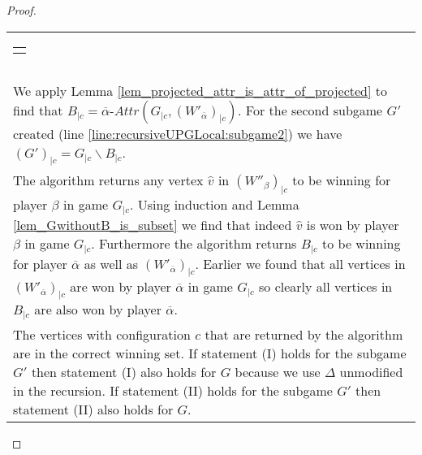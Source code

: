 \begin{theorem}
\begin{proof}
\begin{longtable}{|p{14.2cm}}
\begin{tabular}{|p{14cm}}
\begin{tabular}{|p{13.8cm}}
\begin{tabular}{|p{13.6cm}}
					\end{tabular}\\\\
					\begin{tabular}{|p{13.6cm}}
						Assume $(W'_{\overline{\alpha}})_{|c} \neq \emptyset$\\
						\hline
						We apply Lemma \ref{lem_projected_attr_is_attr_of_projected} to find that $B_{|c} = \overline{\alpha}\textit{-Attr}(G_{|c},(W'_{\overline{\alpha}})_{|c})$. For the second subgame $G'$ created (line \ref{line:recursiveUPGLocal:subgame2}) we have $(G')_{|c} = G_{|c} \backslash B_{|c}$.\\
						The algorithm returns any vertex $\hat{v}$ in $(W''_\beta)_{|c}$ to be winning for player $\beta$ in game $G_{|c}$. Using induction and Lemma \ref{lem_GwithoutB_is_subset} we find that indeed $\hat{v}$ is won by player $\beta$ in game $G_{|c}$. Furthermore the algorithm returns $B_{|c}$ to be winning for player $\overline{\alpha}$ as well as $(W'_{\overline{\alpha}})_{|c}$. Earlier we found that all vertices in $(W'_{\overline{\alpha}})_{|c}$ are won by player $\overline{\alpha}$ in game $G_{|c}$ so clearly all vertices in $B_{|c}$ are also won by player $\overline{\alpha}$.\\
						The vertices with configuration $c$ that are returned by the algorithm are in the correct winning set. If statement (I) holds for the subgame $G'$ then statement (I) also holds for $G$ because we use $\Delta$ unmodified in the recursion. If statement (II) holds for the subgame $G'$ then statement (II) also holds for $G$.
					\end{tabular}
				\end{tabular}
			\end{tabular}
		\end{longtable}
	\end{proof}
\end{theorem}

